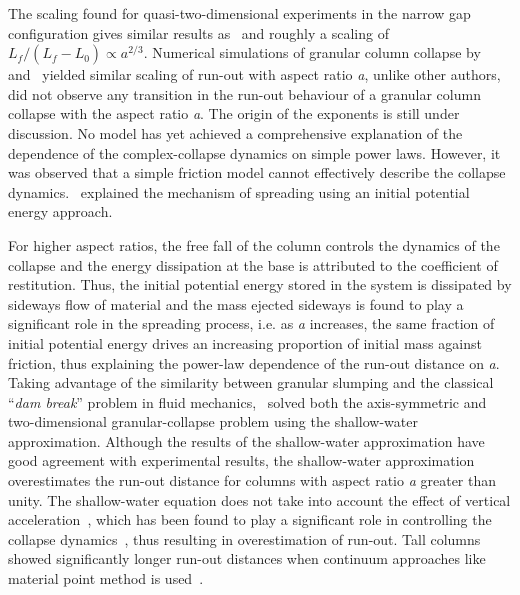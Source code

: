 The scaling found for quasi-two-dimensional experiments in the narrow gap 
configuration gives similar results as~\citet{Lube2005} and roughly a scaling 
of $\textit{L}_{\textit{f}}/({\textit{L}_{\textit{f}} - 
\textit{L}_{\textit{0}}}) \propto \textit{a}^{2/3}$. Numerical simulations of 
granular column collapse by~\citet{Zenit2005} and~\citet{Staron2005} yielded 
similar scaling of run-out with aspect ratio \textit{a}, unlike other 
authors,~\citet{Zenit2005} did not observe any transition in the run-out 
behaviour of a granular column collapse with the aspect ratio \textit{a}. The 
origin of the exponents is still under discussion. No model has yet achieved a 
comprehensive explanation of the dependence of the complex-collapse dynamics on 
simple power laws. However, it was observed that a simple friction model cannot 
effectively describe the collapse dynamics.~\citet{Staron2005} explained the 
mechanism of spreading using an initial potential energy approach. 

For higher 
aspect ratios, the free fall of the column controls the dynamics of the 
collapse and the energy dissipation at the base is attributed to the 
coefficient of restitution. Thus, the initial potential energy stored in the 
system is dissipated by sideways flow of material and the mass ejected sideways 
is found to play a significant role in the spreading process, i.e. as 
\textit{a} increases, the same fraction of initial potential energy drives an 
increasing proportion of initial mass against friction, thus explaining the 
power-law dependence of the run-out distance on \textit{a}. Taking advantage 
of the similarity between granular slumping and the classical ``\textit{dam 
break}'' problem in fluid mechanics,~\citet{Kerswell2005} solved both the 
axis-symmetric and two-dimensional granular-collapse problem using the 
shallow-water approximation. Although the results of the shallow-water 
approximation have good agreement with experimental results, the shallow-water 
approximation overestimates the run-out distance for columns with aspect ratio 
\textit{a} greater than unity. The shallow-water equation does not take into 
account the effect of vertical acceleration~\citep{Lajeunesse2005}, which has 
been found to play a significant role in controlling the collapse 
dynamics~\citet{Staron2005}, thus resulting in overestimation of run-out. Tall 
columns showed significantly longer run-out distances when continuum approaches 
like material point method is used~\citep{Bandara2013,Mast2014}.

